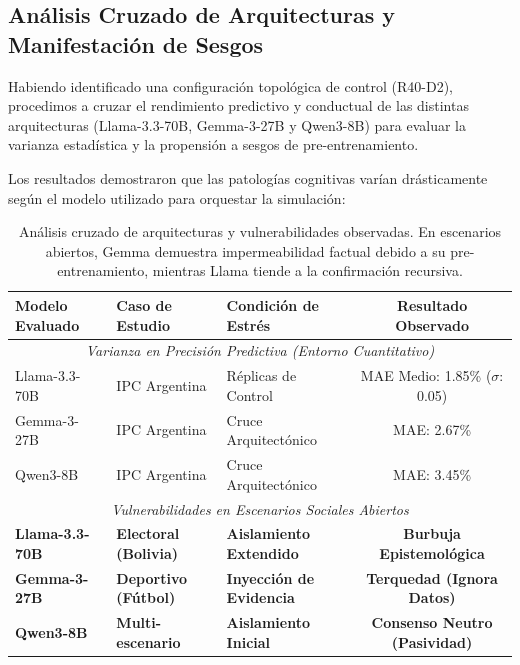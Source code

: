 \documentclass{article}
\begin{document}
\subsection{Análisis Cruzado de Arquitecturas y Manifestación de Sesgos}

Habiendo identificado una configuración topológica de control (R40-D2), procedimos a cruzar el rendimiento predictivo y conductual de las distintas arquitecturas (Llama-3.3-70B, Gemma-3-27B y Qwen3-8B) para evaluar la varianza estadística y la propensión a sesgos de pre-entrenamiento.

Los resultados demostraron que las patologías cognitivas varían drásticamente según el modelo utilizado para orquestar la simulación:

\begin{table}[H]
    \centering
    \begin{tabular}{@{}lllc@{}}
        \toprule
        \textbf{Modelo Evaluado} & \textbf{Caso de Estudio} & \textbf{Condición de Estrés} & \textbf{Resultado Observado} \\ \midrule
        \multicolumn{4}{c}{\textit{Varianza en Precisión Predictiva (Entorno Cuantitativo)}} \\ \midrule
        Llama-3.3-70B & IPC Argentina & Réplicas de Control & MAE Medio: 1.85\% ($\sigma$: 0.05) \\
        Gemma-3-27B & IPC Argentina & Cruce Arquitectónico & MAE: 2.67\% \\
        Qwen3-8B & IPC Argentina & Cruce Arquitectónico & MAE: 3.45\% \\ \midrule
        \multicolumn{4}{c}{\textit{Vulnerabilidades en Escenarios Sociales Abiertos}} \\ \midrule
        \textbf{Llama-3.3-70B} & \textbf{Electoral (Bolivia)} & \textbf{Aislamiento Extendido} & \textbf{Burbuja Epistemológica} \\
        \textbf{Gemma-3-27B} & \textbf{Deportivo (Fútbol)} & \textbf{Inyección de Evidencia} & \textbf{Terquedad (Ignora Datos)} \\
        \textbf{Qwen3-8B} & \textbf{Multi-escenario} & \textbf{Aislamiento Inicial} & \textbf{Consenso Neutro (Pasividad)} \\ \bottomrule
    \end{tabular}
    \caption{Análisis cruzado de arquitecturas y vulnerabilidades observadas. En escenarios abiertos, Gemma demuestra impermeabilidad factual debido a su pre-entrenamiento, mientras Llama tiende a la confirmación recursiva.}
    \label{tab:evaluacion_arquitecturas}
\end{table}
\end{document}
